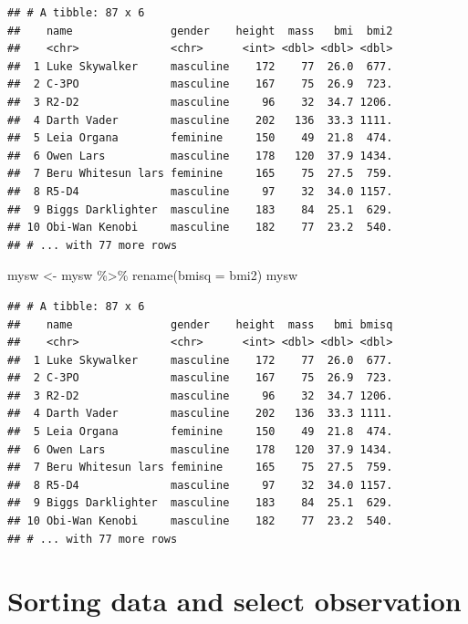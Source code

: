 \documentclass[
]{book}
\makeatletter
\newenvironment{Shaded}{\begin{snugshade}}{\end{snugshade}}
\newcommand{\AttributeTok}[1]{\textcolor[rgb]{0.61,0.61,0.61}{#1}}
\newcommand{\FunctionTok}[1]{\textcolor[rgb]{0,0,0}{#1}}
\newcommand{\NormalTok}[1]{#1}
\newcommand{\OtherTok}[1]{\textcolor[rgb]{0.37,0.37,0.37}{#1}}
\newcommand{\SpecialCharTok}[1]{\textcolor[rgb]{0,0,0}{#1}}
\newenvironment{kframe}{%
\medskip{}
\setlength{\fboxsep}{.8em}
 \def\at@end@of@kframe{}%
 \ifinner\ifhmode%
  \def\at@end@of@kframe{\end{minipage}}%
  \begin{minipage}{\columnwidth}%
 \fi\fi%
 \def\FrameCommand##1{\hskip\@totalleftmargin \hskip-\fboxsep
 \colorbox{shadecolor}{##1}\hskip-\fboxsep
     \hskip-\linewidth \hskip-\@totalleftmargin \hskip\columnwidth}%
 \MakeFramed {\advance\hsize-\width
   \@totalleftmargin\z@ \linewidth\hsize
   \@setminipage}}%
 {\par\unskip\endMakeFramed%
 \at@end@of@kframe}
\renewenvironment{Shaded}{\begin{kframe}}{\end{kframe}}
\makeatother
\begin{document}
\begin{verbatim}
## # A tibble: 87 x 6
##    name               gender    height  mass   bmi  bmi2
##    <chr>              <chr>      <int> <dbl> <dbl> <dbl>
##  1 Luke Skywalker     masculine    172    77  26.0  677.
##  2 C-3PO              masculine    167    75  26.9  723.
##  3 R2-D2              masculine     96    32  34.7 1206.
##  4 Darth Vader        masculine    202   136  33.3 1111.
##  5 Leia Organa        feminine     150    49  21.8  474.
##  6 Owen Lars          masculine    178   120  37.9 1434.
##  7 Beru Whitesun lars feminine     165    75  27.5  759.
##  8 R5-D4              masculine     97    32  34.0 1157.
##  9 Biggs Darklighter  masculine    183    84  25.1  629.
## 10 Obi-Wan Kenobi     masculine    182    77  23.2  540.
## # ... with 77 more rows
\end{verbatim}

\begin{Shaded}
\begin{Highlighting}[]
\NormalTok{mysw }\OtherTok{\textless{}{-}}\NormalTok{ mysw }\SpecialCharTok{\%\textgreater{}\%} \FunctionTok{rename}\NormalTok{(}\AttributeTok{bmisq =}\NormalTok{ bmi2)}
\NormalTok{mysw}
\end{Highlighting}
\end{Shaded}

\begin{verbatim}
## # A tibble: 87 x 6
##    name               gender    height  mass   bmi bmisq
##    <chr>              <chr>      <int> <dbl> <dbl> <dbl>
##  1 Luke Skywalker     masculine    172    77  26.0  677.
##  2 C-3PO              masculine    167    75  26.9  723.
##  3 R2-D2              masculine     96    32  34.7 1206.
##  4 Darth Vader        masculine    202   136  33.3 1111.
##  5 Leia Organa        feminine     150    49  21.8  474.
##  6 Owen Lars          masculine    178   120  37.9 1434.
##  7 Beru Whitesun lars feminine     165    75  27.5  759.
##  8 R5-D4              masculine     97    32  34.0 1157.
##  9 Biggs Darklighter  masculine    183    84  25.1  629.
## 10 Obi-Wan Kenobi     masculine    182    77  23.2  540.
## # ... with 77 more rows
\end{verbatim}

\hypertarget{sorting-data-and-select-observation}{%
\section{Sorting data and select observation}\label{sorting-data-and-select-observation}}
\end{document}
